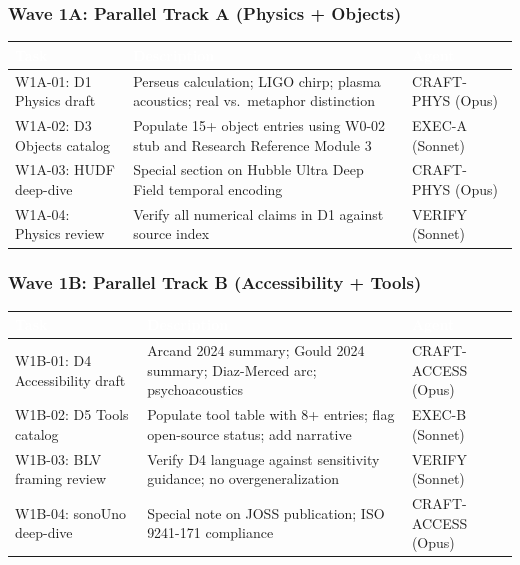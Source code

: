 \documentclass[11pt,letterpaper]{article}
\newcommand{\tableheader}[1]{\textbf{\sffamily\textcolor{white}{#1}}}
\begin{document}
\subsubsection{Wave 1A: Parallel Track A (Physics + Objects)}

\begin{center}
\begin{tabularx}{\textwidth}{L{4cm}XC{2.5cm}}
\toprule
{}
\tableheader{Task} & \tableheader{Description} & \tableheader{Agent} \\
\midrule
W1A-01: D1 Physics draft & Perseus calculation; LIGO chirp; plasma acoustics; real vs.\ metaphor distinction & CRAFT-PHYS (Opus) \\
W1A-02: D3 Objects catalog & Populate 15+ object entries using W0-02 stub and Research Reference Module 3 & EXEC-A (Sonnet) \\
W1A-03: HUDF deep-dive & Special section on Hubble Ultra Deep Field temporal encoding & CRAFT-PHYS (Opus) \\
W1A-04: Physics review & Verify all numerical claims in D1 against source index & VERIFY (Sonnet) \\
\bottomrule
\end{tabularx}
\end{center}

\subsubsection{Wave 1B: Parallel Track B (Accessibility + Tools)}

\begin{center}
\begin{tabularx}{\textwidth}{L{4cm}XC{2.5cm}}
\toprule
{}
\tableheader{Task} & \tableheader{Description} & \tableheader{Agent} \\
\midrule
W1B-01: D4 Accessibility draft & Arcand 2024 summary; Gould 2024 summary; Diaz-Merced arc; psychoacoustics & CRAFT-ACCESS (Opus) \\
W1B-02: D5 Tools catalog & Populate tool table with 8+ entries; flag open-source status; add narrative & EXEC-B (Sonnet) \\
W1B-03: BLV framing review & Verify D4 language against sensitivity guidance; no overgeneralization & VERIFY (Sonnet) \\
W1B-04: sonoUno deep-dive & Special note on JOSS publication; ISO 9241-171 compliance & CRAFT-ACCESS (Opus) \\
\bottomrule
\end{tabularx}
\end{center}
\end{document}
